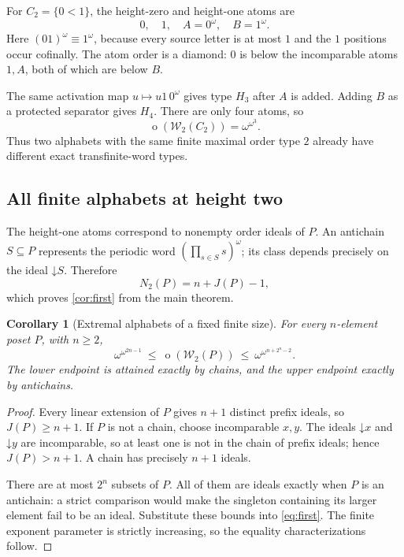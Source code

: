 \documentclass[11pt,letterpaper]{article}
\newtheorem{corollary}[corollary]{Corollary}
\theoremstyle{definition}
\theoremstyle{remark}
\newcommand{\W}{\mathcal W}
\newcommand{\otp}{\operatorname{o}}
\newcommand{\down}{\mathord{\downarrow}}
\begin{document}
For $C_2=\{0<1\}$, the height-zero and height-one atoms are
\[
  0,\quad1,\quad A=0^\omega,\quad B=1^\omega.
\]
Here $(01)^\omega\equiv1^\omega$, because every source letter is at most
$1$ and the $1$ positions occur cofinally. The atom order is a diamond:
$0$ is below the incomparable atoms $1,A$, both of which are below $B$.

The same activation map $u\mapsto u1\,0^\omega$ gives type $H_3$ after
$A$ is added. Adding $B$ as a protected separator gives $H_4$.
There are only four atoms, so
\[
  \otp(\W_2(C_2))=\omega^{\omega^3}.
\]
Thus two alphabets with the same finite maximal order type $2$ already
have different exact transfinite-word types.

\subsection{All finite alphabets at height two}

The height-one atoms correspond to nonempty order ideals of $P$.
An antichain $S\subseteq P$ represents the periodic word
$(\prod_{s\in S}s)^\omega$; its class depends precisely on the ideal
$\down S$. Therefore
\[
  N_2(P)=n+J(P)-1,
\]
which proves \cref{cor:first} from the main theorem.

\begin{corollary}[Extremal alphabets of a fixed finite size]
\label{cor:extremal}
For every $n$-element poset $P$, with $n\ge2$,
\begin{equation}\label{eq:extremal}
  \omega^{\omega^{2n-1}}
  \ \le\ \otp(\W_2(P))
  \ \le\ \omega^{\omega^{n+2^n-2}}.
\end{equation}
The lower endpoint is attained exactly by chains, and the upper endpoint
exactly by antichains.
\end{corollary}

\begin{proof}
Every linear extension of $P$ gives $n+1$ distinct prefix ideals, so
$J(P)\ge n+1$. If $P$ is not a chain, choose incomparable $x,y$.
The ideals $\down x$ and $\down y$ are incomparable, so at least one is
not in the chain of prefix ideals; hence $J(P)>n+1$.
A chain has precisely $n+1$ ideals.

There are at most $2^n$ subsets of $P$. All of them are ideals exactly
when $P$ is an antichain: a strict comparison would make the singleton
containing its larger element fail to be an ideal. Substitute these
bounds into \eqref{eq:first}. The finite exponent parameter is strictly
increasing, so the equality characterizations follow.
\end{proof}
\end{document}
